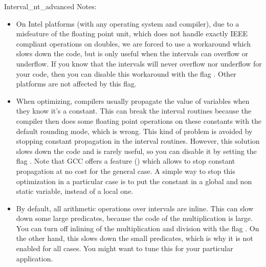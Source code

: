\begin{ccAdvanced}
\begin{ccClass} {Interval_nt_advanced}
Notes:\\
\begin{itemize}
\item On Intel platforms (with any operating system and compiler), due to a
      misfeature of the floating point unit, which does not handle exactly
      IEEE compliant operations on doubles, we are forced to use a workaround
      which slows down the code, but is only useful when the intervals can
      overflow or underflow.  If you know that the intervals will never
      overflow nor underflow for your code, then you can disable this
      workaround with the flag .
      Other platforms are not affected by this flag.
\item When optimizing, compilers usually propagate the value of variables when
      they know it's a constant.  This can break the interval routines because
      the compiler then does some floating point operations on these constants
      with the default rounding mode, which is wrong.  This kind of problem
      is avoided by stopping constant propagation in the interval routines.
      However, this solution slows down the code and is rarely useful, so you
      can disable it by setting the flag
      .
      Note that GCC offers a feature () which allows
      to stop constant propagation at no cost for the general case.
      A simple way to stop this optimization in a particular case is to put
      the constant in a global and non static variable, instead of a local
      one.
\item By default, all arithmetic operations over intervals are inline.  This
      can slow down some large predicates, because the code of the
      multiplication is large.  You can turn off inlining of the
      multiplication and division with the flag .
      On the other hand, this slows down the small predicates, which is why
      it is not enabled for all cases.
      You might want to tune this for your particular application.
\end{itemize}

\end{ccClass}

\end{ccAdvanced}


